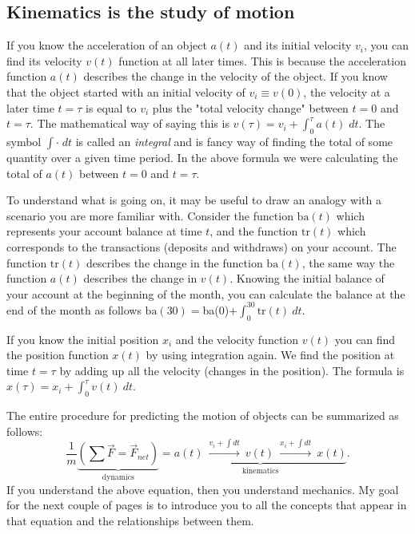 \vspace{-3mm}
\subsection{Kinematics is the study of motion}
If you know the acceleration of an object $a(t)$ and its initial velocity $v_i$, 
you can find its velocity $v(t)$ function at all later times. 
This is because the acceleration function $a(t)$ describes the change in the velocity of the object.
If you know that the object started with an initial velocity of $v_i \equiv v(0)$,
the velocity at a later time $t=\tau$ is equal to $v_i$ plus the "total velocity change" between $t=0$ and $t=\tau$.
The mathematical way of saying this is $v(\tau)=v_i+\int_0^\tau a(t)\;dt$.
The symbol $\int \cdot \;dt$ is called an \emph{integral} and is fancy way of finding the total
of some quantity over a given time period. 
In the above formula we were calculating the total of $a(t)$ between $t=0$ and $t=\tau$.

To understand what is going on, it may be useful to draw an analogy with a scenario you are more familiar with.
Consider the function $\textrm{ba}(t)$ which represents your account balance at time $t$,
and the function $\textrm{tr}(t)$ which corresponds to the transactions (deposits and withdraws) on your account.
The function $\textrm{tr}(t)$ describes the change in the function $\textrm{ba}(t)$,
the same way the function $a(t)$ describes the change in $v(t)$.
Knowing the initial balance of your account at the beginning of the month,
you can calculate the balance at the end of the month as follows $\textrm{ba}(30)=$\textrm{ba}(0)$+\int_0^{30} \textrm{tr}(t)\:dt$.

If you know the initial position $x_i$ and the velocity function $v(t)$ you can find the position function $x(t)$ by using integration again.  
We find the position at time $t=\tau$ by adding up all the velocity (changes in the position). 
The formula is $x(\tau) = x_i + \int_0^\tau v(t)\:dt$.


The entire procedure for predicting the motion of objects can be summarized as follows:
\begin{equation}
\frac{1}{m} \underbrace{ \left( \sum \vec{F} = \vec{F}_{net}  \right) }_{\text{dynamics}} = \underbrace{ a(t) \ \overset{v_i+ \int\!dt }{\longrightarrow} \ v(t) \ \overset{x_i+ \int\!dt }{\longrightarrow} \ x(t) }_{\text{kinematics}}.
 \label{fma-eqn}
\end{equation}
%
If you understand the above equation, then you understand mechanics.
My goal for the next couple of pages is to introduce you to all the concepts that 
appear in that equation and the relationships between them. 




